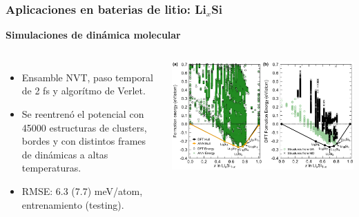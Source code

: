 \documentclass[aspectratio=169]{beamer}
\let\oldtextbf\textbf
\renewcommand{\textbf}[1]{\textcolor{nordblue}{\oldtextbf{#1}}}
\begin{document}
    \begin{frame}
        \frametitle{Aplicaciones en baterias de litio: Li$_x$Si}
        
        \textbf{Simulaciones de dinámica molecular}
        
        \begin{columns}
            \begin{itemize}
                \item Ensamble NVT, paso temporal de 2 fs y algorítmo de Verlet.
                \item Se reentrenó el potencial con 45000 estructuras de clusters, 
                    bordes y con distintos frames de dinámicas a altas
                    temperaturas.
                \item RMSE: 6.3 (7.7) meV/atom, entrenamiento (testing).
            \end{itemize}

            \pause

            \begin{center}
                \includegraphics[width=\columnwidth]{LiSi-energias_de_formacion.png}
            \end{center}
        \end{columns}
            
    \end{frame}
    
\end{document}
